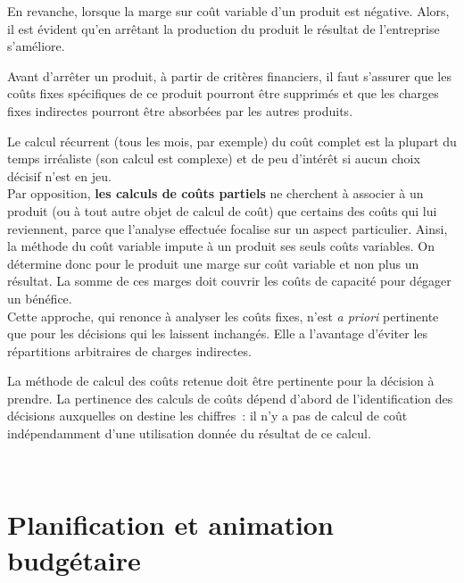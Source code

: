 \documentclass{kaobook}
\begin{document}
En revanche, lorsque la marge sur coût variable d'un produit est négative. Alors, il est évident qu'en arrêtant la production du produit le résultat de l'entreprise s'améliore.\\

\begin{warning}
Avant d'arrêter un produit, à partir de critères financiers, il faut s'assurer que les coûts fixes spécifiques de ce produit pourront être supprimés et que les charges fixes indirectes pourront être absorbées par les autres produits.\\
\end{warning}

Le calcul récurrent (tous les mois, par exemple) du coût complet est la plupart du temps irréaliste (son calcul est complexe) et de peu d'intérêt si aucun choix décisif n'est en jeu.\\

Par opposition, \textbf{les calculs de coûts partiels} ne cherchent à associer à un produit (ou à tout autre objet de calcul de coût) que certains des coûts qui lui reviennent, parce que l'analyse effectuée focalise sur un aspect particulier. Ainsi, la méthode du coût variable impute à un produit ses seuls coûts variables. On détermine donc pour le produit une marge sur coût variable et non plus un résultat. La somme de ces marges doit couvrir les coûts de capacité pour dégager un bénéfice.\\
Cette approche, qui renonce à analyser les coûts fixes, n'est \emph{a priori} pertinente que pour les décisions qui les laissent inchangés. Elle a l'avantage d'éviter les répartitions arbitraires de charges indirectes.\\

\begin{warning}
La méthode de calcul des coûts retenue doit être pertinente pour la décision à prendre. La pertinence des calculs de coûts dépend d'abord de l'identification des décisions auxquelles on destine les chiffres : il n'y a pas de calcul de coût indépendamment d'une utilisation donnée du résultat de ce calcul.\\
\end{warning}

\clearpage\\
\chapter{Planification et animation budgétaire}
\label{sec:org0412a4a}
\end{document}
